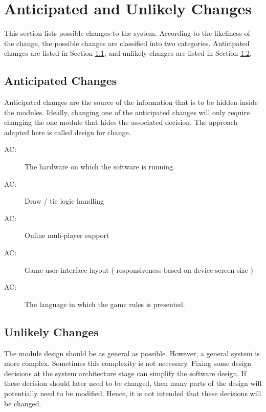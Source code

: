 \documentclass[12pt, titlepage]{article}
\newcounter{acnum}
\newcommand{\actheacnum}{AC\theacnum}
\begin{document}
\section{Anticipated and Unlikely Changes} \label{SecChange}

This section lists possible changes to the system. According to the likeliness
of the change, the possible changes are classified into two
categories. Anticipated changes are listed in Section \ref{SecAchange}, and
unlikely changes are listed in Section \ref{SecUchange}.

\subsection{Anticipated Changes} \label{SecAchange}

Anticipated changes are the source of the information that is to be hidden
inside the modules. Ideally, changing one of the anticipated changes will only
require changing the one module that hides the associated decision. The approach
adapted here is called design for
change.

\begin{description}
\item[ \actheacnum \label{ac1}:] The hardware on which the software is running.
\item[ \actheacnum \label{ac2}:] Draw / tie logic handling
\item[ \actheacnum \label{ac3}:] Online muli-player support
\item[ \actheacnum :\label{ac4}] Game user interface layout ( responsiveness based on device screen size  )
\item[ \actheacnum \label{ac5}:] The language in which the game rules is presented.

\end{description}

\subsection{Unlikely Changes} \label{SecUchange}

The module design should be as general as possible. However, a general system is
more complex. Sometimes this complexity is not necessary. Fixing some design
decisions at the system architecture stage can simplify the software design. If
these decision should later need to be changed, then many parts of the design
will potentially need to be modified. Hence, it is not intended that these
decisions will be changed.
\end{document}
